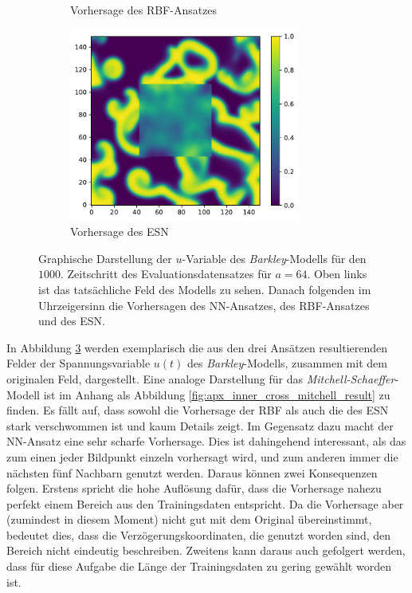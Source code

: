 \begin{figure}[h]
\begin{subfigure}{.5\textwidth}
		\setcapmargin[1cm]{0.5cm}
  		\caption{Vorhersage des \textsc{RBF}-Ansatzes}
  		\label{fig:exp_inner_cross_barkley_result_rbf_pred}
	\end{subfigure}%
	\begin{subfigure}{.5\textwidth}
		\centering
		\includegraphics[height=2.5in]{figures/results/inner_cross_prediction/barkley_u_inner_esn.pdf}
		\setcapmargin[1cm]{0.5cm}
  		\caption{Vorhersage des \textsc{ESN}}
  		\label{fig:exp_inner_cross_barkley_result_esn_pred}
	\end{subfigure}
	\caption{Graphische Darstellung der $u$-Variable des \textit{Barkley}-Modells für den $1000$. Zeitschritt des Evaluationsdatensatzes für $a=64$. Oben links ist das tatsächliche Feld des Modells zu sehen. Danach folgenden im Uhrzeigersinn die Vorhersagen des \textsc{NN}-Ansatzes, des \textsc{RBF}-Ansatzes und des \textsc{ESN}.}
	\label{fig:exp_inner_cross_barkley_result}
\end{figure} 

In Abbildung \ref{fig:exp_inner_cross_barkley_result} werden exemplarisch die aus den drei Ansätzen resultierenden Felder der Spannungsvariable $u(t)$ des \textit{Barkley}-Modells, zusammen mit dem originalen Feld, dargestellt. Eine analoge Darstellung für das \textit{Mitchell-Schaeffer}-Modell ist im Anhang als Abbildung \ref{fig:apx_inner_cross_mitchell_result} zu finden. Es fällt auf, dass sowohl die Vorhersage der \textsc{RBF} als auch die des \textsc{ESN} stark verschwommen ist und kaum Details zeigt. Im Gegensatz dazu macht der \textsc{NN}-Ansatz eine sehr scharfe Vorhersage. Dies ist dahingehend interessant, als das zum einen jeder Bildpunkt einzeln vorhersagt wird, und zum anderen immer die nächsten fünf Nachbarn genutzt werden. Daraus können zwei Konsequenzen folgen. Erstens spricht die hohe Auflösung dafür, dass die Vorhersage nahezu perfekt einem Bereich aus den Trainingsdaten entspricht. Da die Vorhersage aber (zumindest in diesem Moment) nicht gut mit dem Original übereinstimmt, bedeutet dies, dass die Verzögerungskoordinaten, die genutzt worden sind, den Bereich nicht eindeutig beschreiben. Zweitens kann daraus auch gefolgert werden, dass für diese Aufgabe die Länge der Trainingsdaten zu gering gewählt worden ist. 
